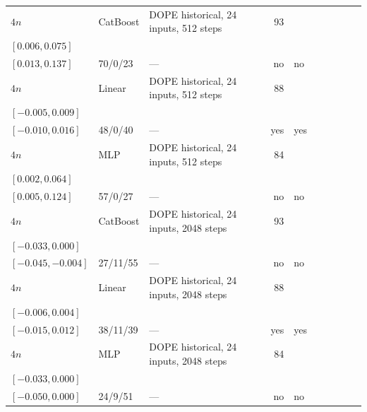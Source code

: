 \begin{longtable}{@{}ll>{\raggedright\arraybackslash}p{1.1in}rllrlll@{}}
$4n$ & CatBoost & DOPE historical, 24 inputs, 512 steps & 93 & \begin{tabular}[t]{@{}l@{}}$0.033$\\\tiny$[0.006, 0.075]$\end{tabular} & \begin{tabular}[t]{@{}l@{}}$0.051$\\\tiny$[0.013, 0.137]$\end{tabular} & 70/0/23 & --- & no & no \\
$4n$ & Linear & DOPE historical, 24 inputs, 512 steps & 88 & \begin{tabular}[t]{@{}l@{}}$0.001$\\\tiny$[-0.005, 0.009]$\end{tabular} & \begin{tabular}[t]{@{}l@{}}$0.003$\\\tiny$[-0.010, 0.016]$\end{tabular} & 48/0/40 & --- & yes & yes \\
$4n$ & MLP & DOPE historical, 24 inputs, 512 steps & 84 & \begin{tabular}[t]{@{}l@{}}$0.024$\\\tiny$[0.002, 0.064]$\end{tabular} & \begin{tabular}[t]{@{}l@{}}$0.047$\\\tiny$[0.005, 0.124]$\end{tabular} & 57/0/27 & --- & no & no \\
$4n$ & CatBoost & DOPE historical, 24 inputs, 2048 steps & 93 & \begin{tabular}[t]{@{}l@{}}$-0.012$\\\tiny$[-0.033, 0.000]$\end{tabular} & \begin{tabular}[t]{@{}l@{}}$-0.020$\\\tiny$[-0.045, -0.004]$\end{tabular} & 27/11/55 & --- & no & no \\
$4n$ & Linear & DOPE historical, 24 inputs, 2048 steps & 88 & \begin{tabular}[t]{@{}l@{}}$0.000$\\\tiny$[-0.006, 0.004]$\end{tabular} & \begin{tabular}[t]{@{}l@{}}$0.000$\\\tiny$[-0.015, 0.012]$\end{tabular} & 38/11/39 & --- & yes & yes \\
$4n$ & MLP & DOPE historical, 24 inputs, 2048 steps & 84 & \begin{tabular}[t]{@{}l@{}}$-0.011$\\\tiny$[-0.033, 0.000]$\end{tabular} & \begin{tabular}[t]{@{}l@{}}$-0.023$\\\tiny$[-0.050, 0.000]$\end{tabular} & 24/9/51 & --- & no & no \\

\end{longtable}
